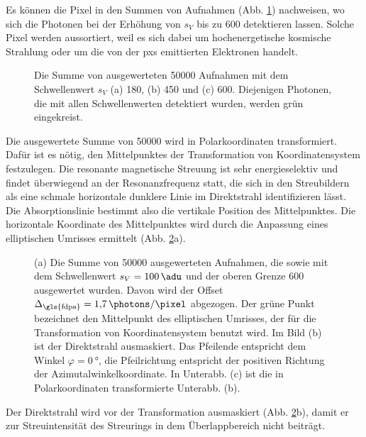 \noindent
Es können die Pixel in den Summen von Aufnahmen (Abb. \ref{fig:th_180_450_600}) nachweisen, wo sich die Photonen bei der Erhöhung von $s_V$ bis zu \SI{600}{\adu} detektieren lassen. Solche Pixel werden aussortiert, weil es sich dabei um hochenergetische kosmische Strahlung oder um die von der \gls{pxs} emittierten Elektronen handelt.
\begin{figure}[H]
    \centering
    
    \caption{Die Summe von ausgewerteten \num{50000} Aufnahmen mit dem Schwellenwert $s_V$ (a) \SI{180}{\adu}, (b) \SI{450}{\adu} und (c) \SI{600}{\adu}. Diejenigen Photonen, die mit allen Schwellenwerten detektiert wurden, werden grün eingekreist.}
    \label{fig:th_180_450_600}
\end{figure}
\noindent
Die ausgewertete Summe von \SI{50000}{\captures} wird in Polarkoordinaten transformiert. Dafür ist es nötig, den Mittelpunktes der Transformation von Koordinatensystem festzulegen. Die resonante magnetische Streuung ist sehr energieselektiv und findet überwiegend an der Resonanzfrequenz statt, die sich in den Streubildern als eine schmale horizontale dunklere Linie im Direktstrahl identifizieren lässt. Die Absorptionslinie bestimmt also die vertikale Position des Mittelpunktes. Die horizontale Koordinate des Mittelpunktes wird durch die Anpassung eines elliptischen Umrisses ermittelt (Abb. \ref{fig:th-100-200-maske-radial-transform}a).
\begin{figure}[H]
    \centering
    
    \caption{(a) Die Summe von \num{50000} ausgewerteten Aufnahmen, die sowie mit dem Schwellenwert $s_V = \SI{100}{\adu}$ und der oberen Grenze \SI{600}{\adu} ausgewertet wurden. Davon wird der Offset $\Delta_\text{\gls{fdpa}} = \SI{1,7}{\photons\per\pixel}$ abgezogen. Der grüne Punkt bezeichnet den Mittelpunkt des elliptischen Umrisses, der für die Transformation von Koordinatensystem benutzt wird. Im Bild (b) ist der Direktstrahl ausmaskiert. Das Pfeilende entspricht dem Winkel $\varphi = \SI{0}{\degree}$, die Pfeilrichtung entspricht der positiven Richtung der Azimutalwinkelkoordinate. In Unterabb. (c) ist die in Polarkoordinaten transformierte Unterabb. (b).}
    \label{fig:th-100-200-maske-radial-transform}
\end{figure}
\noindent
Der Direktstrahl wird vor der Transformation ausmaskiert (Abb. \ref{fig:th-100-200-maske-radial-transform}b), damit er zur Streuintensität des Streurings in dem Überlappbereich nicht beiträgt.

